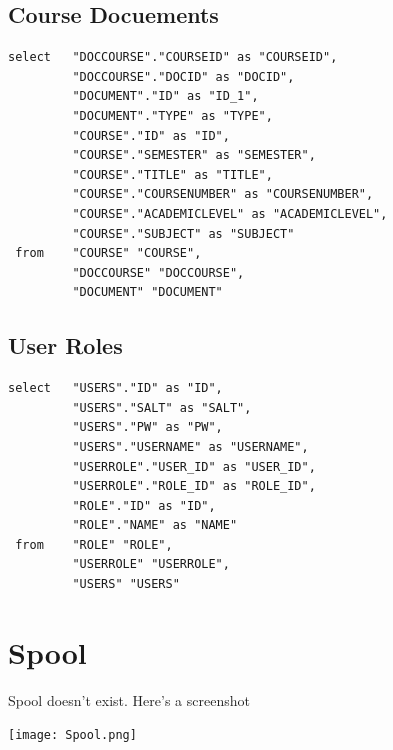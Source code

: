 \documentclass[11pt]{article}
\begin{document}
\subsection{Course Docuements}
\label{sec-5-5}



\begin{verbatim}
select   "DOCCOURSE"."COURSEID" as "COURSEID",
         "DOCCOURSE"."DOCID" as "DOCID",
         "DOCUMENT"."ID" as "ID_1",
         "DOCUMENT"."TYPE" as "TYPE",
         "COURSE"."ID" as "ID",
         "COURSE"."SEMESTER" as "SEMESTER",
         "COURSE"."TITLE" as "TITLE",
         "COURSE"."COURSENUMBER" as "COURSENUMBER",
         "COURSE"."ACADEMICLEVEL" as "ACADEMICLEVEL",
         "COURSE"."SUBJECT" as "SUBJECT" 
 from    "COURSE" "COURSE",
         "DOCCOURSE" "DOCCOURSE",
         "DOCUMENT" "DOCUMENT"
\end{verbatim}
\subsection{User Roles}
\label{sec-5-6}



\begin{verbatim}
select   "USERS"."ID" as "ID",
         "USERS"."SALT" as "SALT",
         "USERS"."PW" as "PW",
         "USERS"."USERNAME" as "USERNAME",
         "USERROLE"."USER_ID" as "USER_ID",
         "USERROLE"."ROLE_ID" as "ROLE_ID",
         "ROLE"."ID" as "ID",
         "ROLE"."NAME" as "NAME" 
 from    "ROLE" "ROLE",
         "USERROLE" "USERROLE",
         "USERS" "USERS"
\end{verbatim}
\section{Spool}
\label{sec-6}


  Spool doesn't exist. Here's a screenshot

  \texttt{[image: Spool.png]}
\end{document}
